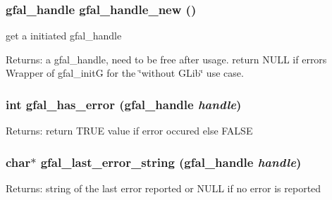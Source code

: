 \subsubsection{\setlength{\rightskip}{0pt plus 5cm}gfal\_\-handle gfal\_\-handle\_\-new ()}\label{gfal__common__interface_8h_4211faf02a3c5cc696c7c9f974415d11}


get a initiated gfal\_\-handle 

\begin{Desc}
\item[Returns:]a gfal\_\-handle, need to be free after usage. return NULL if errors Wrapper of gfal\_\-init\-G for the \char`\"{}without GLib\char`\"{} use case. \end{Desc}
\subsubsection{\setlength{\rightskip}{0pt plus 5cm}int gfal\_\-has\_\-error (gfal\_\-handle {\em handle})}\label{gfal__common__interface_8h_ad28f1c5d1a0ed623834e6133bb7dd2e}


\begin{Desc}
\item[Returns:]return TRUE value if error occured else FALSE \end{Desc}
\subsubsection{\setlength{\rightskip}{0pt plus 5cm}char$\ast$ gfal\_\-last\_\-error\_\-string (gfal\_\-handle {\em handle})}\label{gfal__common__interface_8h_bdebd69c0c6a74b1b5adf88b5e836d8a}


\begin{Desc}
\item[Returns:]string of the last error reported or NULL if no error is reported \end{Desc}
